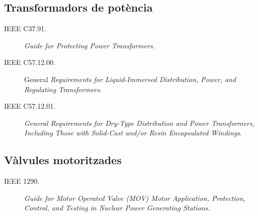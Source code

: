 \subsection*{Transformadors de potència}
\begin{description}
	\item [\hspace{5mm}IEEE C37.91.] \textit{Guide for Protecting Power Transformers}.
	\item [\hspace{5mm}IEEE C57.12.00.] General \textit{Requirements for Liquid-Immersed Distribution, Power, and Regulating Transformers}.
	\item [\hspace{5mm}IEEE C57.12.01.] \textit{General Requirements for Dry-Type Distribution and Power Transformers, Including Those with Solid-Cast and/or Resin Encapsulated Windings}.
\end{description}


\subsection*{Vàlvules motoritzades}
\begin{description}
	\item [\hspace{5mm}IEEE 1290.] \textit{Guide for Motor Operated Valve (MOV) Motor Application, Protection, Control, and Testing in Nuclear Power Generating Stations}.
\end{description}

